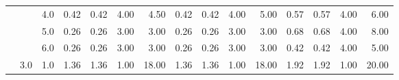 \begin{tabular}{lllrrrrrrrrrrrr}
       &     & 4.0  &       0.42 &      0.42 & 4.00 &   4.50 &       0.42 &      0.42 & 4.00 &   5.00 &       0.57 &      0.57 & 4.00 &   6.00 \\
       &     & 5.0  &       0.26 &      0.26 & 3.00 &   3.00 &       0.26 &      0.26 & 3.00 &   3.00 &       0.68 &      0.68 & 4.00 &   8.00 \\
       &     & 6.0  &       0.26 &      0.26 & 3.00 &   3.00 &       0.26 &      0.26 & 3.00 &   3.00 &       0.42 &      0.42 & 4.00 &   5.00 \\
       & 3.0 & 1.0  &       1.36 &      1.36 & 1.00 &  18.00 &       1.36 &      1.36 & 1.00 &  18.00 &       1.92 &      1.92 & 1.00 &  20.00 \\
\bottomrule
\end{tabular}
